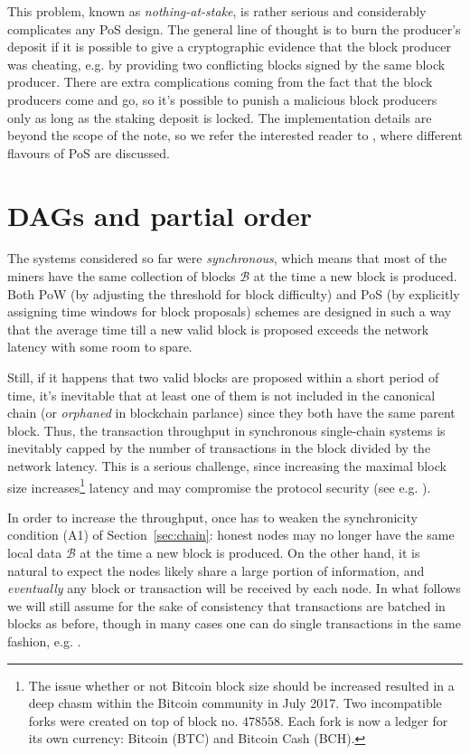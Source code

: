 \documentclass[a4paper]{article}
\begin{document}
   This problem, known as \emph{nothing-at-stake}, is rather serious and considerably complicates any PoS design. The general line of thought is to burn the producer's deposit if it is possible to give a cryptographic evidence that the block producer was cheating, e.g. by providing two conflicting blocks signed by the same block producer. There are extra complications coming from the fact that the block producers come and go, so it's possible to punish a malicious block producers only as long as the staking deposit is locked. The implementation details are beyond the scope of the note, so we refer the interested reader to \cite{PoSFAQ}, where different flavours of PoS are discussed. 
  
\section{DAGs and partial order} \label{sec:dags}

The systems considered so far were \emph{synchronous}, which means that most of the miners have the same collection of blocks $\mathcal{B}$ at the time a new block is produced. Both PoW (by adjusting the threshold for block difficulty) and PoS (by explicitly assigning time windows for block proposals) schemes are designed in such a way that the average time till a new valid block is proposed exceeds the network latency with some room to spare.

Still, if it happens that two valid blocks are proposed within a short period of time, it's inevitable that at least one of them is not included in the canonical chain (or \emph{orphaned} in blockchain parlance) since they both have the same parent block. Thus, the transaction throughput in synchronous single-chain systems is inevitably capped by the number of transactions in the block divided by the network latency. This is a serious challenge, since increasing the maximal block size increases\footnote{The issue whether or not Bitcoin block size should be increased resulted in a deep chasm within the Bitcoin community in July 2017. Two incompatible forks were created on top of block no. $478558$. Each fork is now a ledger for its own currency: Bitcoin (BTC) and Bitcoin Cash (BCH).} latency and may compromise the protocol security (see e.g. \cite{GHOST}).

In order to increase the throughput, once has to  weaken the synchronicity condition (A1) of Section~\ref{sec:chain}: honest nodes may no longer have the same local data $\mathcal{B}$ at the time a new block is produced. On the other hand, it is natural to expect the nodes likely share a large portion of information, and \emph{eventually} any block or transaction will be received by each node. In what follows we will still assume for the sake of consistency that transactions are batched in blocks as before, though in many cases one can do single transactions in the same fashion, e.g. \cite{IOTA}.
\end{document}
